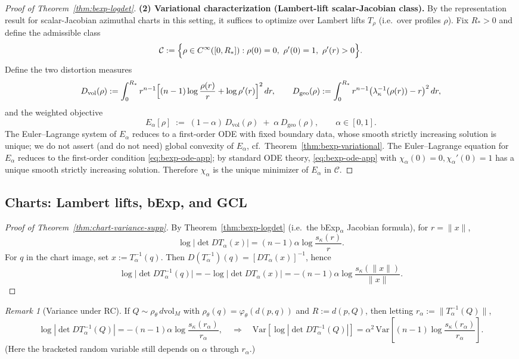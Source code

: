 \documentclass{article}
\theoremstyle{definition}
\theoremstyle{remark}
\newtheorem{remark}{Remark}
\begin{document}
\begin{proof}[Proof of Theorem~\ref{thm:bexp-logdet}]
\textbf{(2) Variational characterization (Lambert-lift scalar-Jacobian class).}
By the representation result for scalar-Jacobian azimuthal charts in this setting,
it suffices to optimize over Lambert lifts $T_\rho$ (i.e.\ over profiles $\rho$).
Fix $R_\ast>0$ and define the admissible class
\[
\mathcal{C}:=\Bigl\{\rho\in C^\infty([0,R_\ast]) : \rho(0)=0,\ \rho'(0)=1,\ \rho'(r)>0\Bigr\}.
\]
Define the two distortion measures
\[
D_{\mathrm{vol}}(\rho)
:=\int_0^{R_\ast} r^{n-1}\Bigl[(n-1)\log\frac{\rho(r)}{r}+\log\rho'(r)\Bigr]^2\,dr,
\qquad
D_{\mathrm{geo}}(\rho)
:=\int_0^{R_\ast} r^{n-1}\bigl(\lambda_\kappa^{-1}(\rho(r))-r\bigr)^2\,dr,
\]
and the weighted objective
\[
E_\alpha[\rho] \;:=\; (1-\alpha)\,D_{\mathrm{vol}}(\rho)\;+\;\alpha\,D_{\mathrm{geo}}(\rho),
\qquad \alpha\in[0,1].
\]
The Euler--Lagrange system of $E_\alpha$ reduces to a first-order ODE with fixed
boundary data, whose smooth strictly increasing solution is unique; we do not assert
(and do not need) global convexity of $E_\alpha$, cf.\ Theorem~\ref{thm:bexp-variational}. The Euler--Lagrange equation for $E_\alpha$
reduces to the first-order condition \eqref{eq:bexp-ode-app}; by standard ODE theory,
\eqref{eq:bexp-ode-app} with $\chi_\alpha(0)=0,\chi_\alpha'(0)=1$ has a unique smooth strictly
increasing solution. Therefore $\chi_\alpha$ is the unique minimizer of $E_\alpha$ in $\mathcal{C}$.
\end{proof}





\subsection{Charts: Lambert lifts, bExp, and GCL}
\label{app:charts_proofs}


\begin{proof}[Proof of Theorem~\ref{thm:chart-variance-supp}]
By Theorem~\ref{thm:bexp-logdet} (i.e.\ the bExp$_\alpha$ Jacobian formula),
for $r=\|x\|$,
\[
\log|\det DT_\alpha(x)|=(n-1)\alpha\log\frac{s_\kappa(r)}{r}.
\]
For $q$ in the chart image, set $x:=T_\alpha^{-1}(q)$. Then
$D(T_\alpha^{-1})(q)=[DT_\alpha(x)]^{-1}$, hence
\[
\log\bigl|\det DT_\alpha^{-1}(q)\bigr|
=-\log|\det DT_\alpha(x)|
=-(n-1)\alpha\log\frac{s_\kappa(\|x\|)}{\|x\|}.
\]
\end{proof}

\begin{remark}[Variance under RC]
If $Q\sim \rho_\theta\,d\mathrm{vol}_M$ with $\rho_\theta(q)=\varphi_\theta(d(p,q))$ and
$R:=d(p,Q)$, then letting $r_\alpha:=\|T_\alpha^{-1}(Q)\|$,
\[
\log|\det DT_\alpha^{-1}(Q)|=-(n-1)\alpha\log\frac{s_\kappa(r_\alpha)}{r_\alpha},
\quad\Rightarrow\quad
\mathrm{Var}\!\left[\log|\det DT_\alpha^{-1}(Q)|\right]
=\alpha^2\,\mathrm{Var}\!\left[(n-1)\log\frac{s_\kappa(r_\alpha)}{r_\alpha}\right].
\]
(Here the bracketed random variable still depends on $\alpha$ through $r_\alpha$.)
\end{remark}
\end{document}
